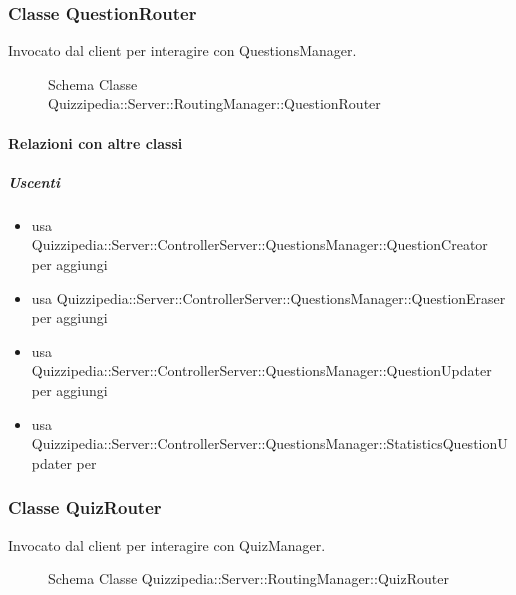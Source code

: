 \subsubsection{Classe QuestionRouter}
Invocato dal client per interagire con QuestionsManager.
\begin{figure}[H]
\centering
\noindent{}
\caption[Schema Classe QuestionRouter]{Schema Classe Quizzipedia::Server::RoutingManager::QuestionRouter}
\end{figure}
\paragraph{Relazioni con altre classi}
\subparagraph{Uscenti}
\begin{itemize}
\item usa Quizzipedia::Server::ControllerServer::QuestionsManager::QuestionCreator per aggiungi
\item usa Quizzipedia::Server::ControllerServer::QuestionsManager::QuestionEraser per aggiungi
\item usa Quizzipedia::Server::ControllerServer::QuestionsManager::QuestionUpdater per aggiungi
\item usa Quizzipedia::Server::ControllerServer::QuestionsManager::StatisticsQuestionUpdater per 
\end{itemize}
\subsubsection{Classe QuizRouter}
Invocato dal client per interagire con QuizManager.
\begin{figure}[H]
\centering
\noindent{}
\caption[Schema Classe QuizRouter]{Schema Classe Quizzipedia::Server::RoutingManager::QuizRouter}
\end{figure}
